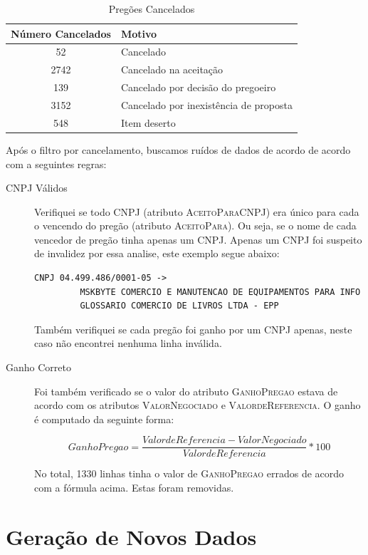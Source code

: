 \documentclass[brazil,a4paper,12pt]{article}
\begin{document}
\begin{table}
\centering
\small
\begin{tabular}{cl}
\toprule
Número Cancelados & Motivo  \\
\midrule
52 & Cancelado \\
\midrule
2742 & Cancelado na aceitação \\
\midrule
139 & Cancelado por decisão do pregoeiro \\
\midrule
3152 & Cancelado por inexistência de proposta \\
\midrule
548 & Item deserto \\
\bottomrule
\end{tabular}
\caption{Pregões Cancelados}
\label{tab:canc}
\end{table}

Após o filtro por cancelamento, buscamos ruídos de dados de acordo de acordo com a seguintes regras:

\begin{description}
\item [CNPJ Válidos] Verifiquei se todo CNPJ (atributo \textsc{AceitoParaCNPJ}) era único para cada o vencendo do pregão (atributo \textsc{AceitoPara}). Ou seja, se o nome de cada vencedor de pregão tinha apenas um CNPJ. Apenas um CNPJ foi suspeito de invalidez por essa analise, este exemplo segue abaixo:

\begin{verbatim}
CNPJ 04.499.486/0001-05 ->
         MSKBYTE COMERCIO E MANUTENCAO DE EQUIPAMENTOS PARA INFO
         GLOSSARIO COMERCIO DE LIVROS LTDA - EPP
\end{verbatim}

Também verifiquei se cada pregão foi ganho por um CNPJ apenas, neste caso não encontrei nenhuma linha inválida.

\item [Ganho Correto] Foi também verificado se o valor do atributo \textsc{GanhoPregao} estava de acordo com os atributos \textsc{ValorNegociado} e \textsc{ValordeReferencia}. O ganho é computado da seguinte forma:

$$ GanhoPregao = \frac{ValordeReferencia - ValorNegociado}{ValordeReferencia} * 100 $$

\noindent No total, 1330 linhas tinha o valor de \textsc{GanhoPregao} errados de acordo com a fórmula acima. Estas foram removidas.

\end{description}

\section{Geração de Novos Dados}
\end{document}
